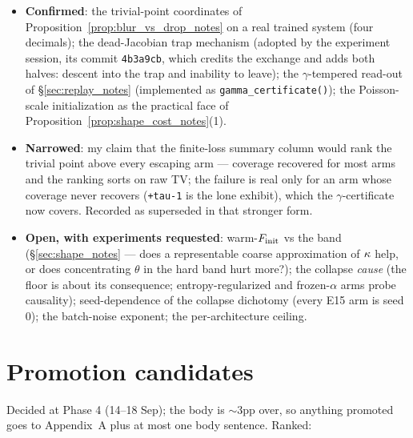 \documentclass[11pt]{article}
\theoremstyle{definition}
\theoremstyle{remark}
\begin{document}
\begin{itemize}
    \item \textbf{Confirmed}: the trivial-point coordinates of
    Proposition~\ref{prop:blur_vs_drop_notes} on a real trained system (four decimals); the
    dead-Jacobian trap mechanism (adopted by the experiment session, its commit
    \texttt{4b3a9cb}, which credits the exchange and adds both halves: descent into the
    trap and inability to leave); the $\gamma$-tempered read-out of \S\ref{sec:replay_notes}
    (implemented as \texttt{gamma\_certificate()}); the Poisson-scale initialization as
    the practical face of Proposition~\ref{prop:shape_cost_notes}(1).
    \item \textbf{Narrowed}: my claim that the finite-loss summary column would rank the
    trivial point above every escaping arm --- coverage recovered for most arms and the
    ranking sorts on raw TV; the failure is real only for an arm whose coverage never
    recovers (\texttt{+tau-1} is the lone exhibit), which the $\gamma$-certificate now
    covers. Recorded as superseded in that stronger form.
    \item \textbf{Open, with experiments requested}: warm-$F_{\mathrm{init}}$ vs the band
    (\S\ref{sec:shape_notes} --- does a representable coarse approximation of $\kappa$ help,
    or does concentrating $\theta$ in the hard band hurt more?); the collapse
    \emph{cause} (the floor is about its consequence; entropy-regularized and
    frozen-$\alpha$ arms probe causality); seed-dependence of the collapse dichotomy
    (every E15 arm is seed $0$); the batch-noise exponent; the per-architecture ceiling.
\end{itemize}

\section{Promotion candidates}\label{sec:promotion_notes}

Decided at Phase 4 (14--18 Sep); the body is $\sim$3pp over, so anything promoted goes to
Appendix~A plus at most one body sentence. Ranked:
\end{document}
